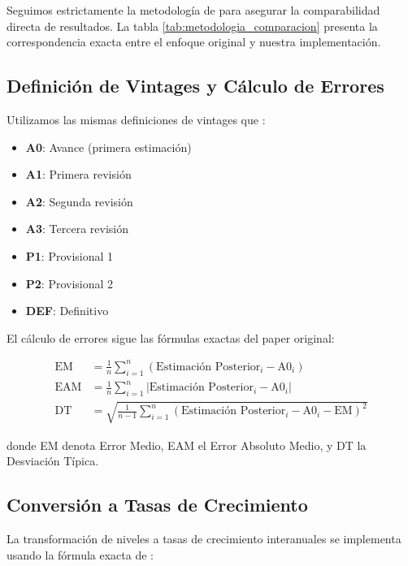 \documentclass[12pt,a4paper]{article}
\begin{document}
Seguimos estrictamente la metodología de \citet{pavia2017} para asegurar la comparabilidad directa de resultados. La tabla \ref{tab:metodologia_comparacion} presenta la correspondencia exacta entre el enfoque original y nuestra implementación.



\subsection{Definición de Vintages y Cálculo de Errores}

Utilizamos las mismas definiciones de vintages que \citet{pavia2017}:

\begin{itemize}
\item \textbf{A0}: Avance (primera estimación)
\item \textbf{A1}: Primera revisión
\item \textbf{A2}: Segunda revisión  
\item \textbf{A3}: Tercera revisión
\item \textbf{P1}: Provisional 1
\item \textbf{P2}: Provisional 2
\item \textbf{DEF}: Definitivo
\end{itemize}

El cálculo de errores sigue las fórmulas exactas del paper original:

\begin{align}
\text{EM} &= \frac{1}{n}\sum_{i=1}^{n}(\text{Estimación Posterior}_i - \text{A0}_i) \label{eq:em}\\
\text{EAM} &= \frac{1}{n}\sum_{i=1}^{n}|\text{Estimación Posterior}_i - \text{A0}_i| \label{eq:eam}\\
\text{DT} &= \sqrt{\frac{1}{n-1}\sum_{i=1}^{n}(\text{Estimación Posterior}_i - \text{A0}_i - \text{EM})^2} \label{eq:dt}
\end{align}

donde EM denota Error Medio, EAM el Error Absoluto Medio, y DT la Desviación Típica.

\subsection{Conversión a Tasas de Crecimiento}

La transformación de niveles a tasas de crecimiento interanuales se implementa usando la fórmula exacta de \citet{pavia2017}:
\end{document}
